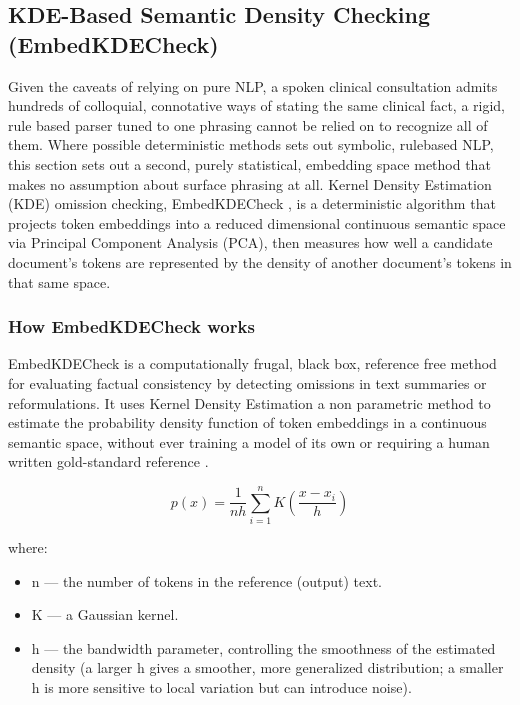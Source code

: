 \documentclass[11pt,a4paper]{article}
\begin{document}
\subsection{KDE-Based Semantic Density Checking (EmbedKDECheck) }
\label{sec:KDE-Based Semantic Density Checking (EmbedKDECheck)}

Given the caveats of relying on pure NLP, a spoken clinical consultation admits hundreds of colloquial, connotative ways of stating the same clinical fact, a rigid, rule based parser tuned to one phrasing cannot be relied on to recognize all of them. Where possible deterministic methods sets out symbolic, rulebased NLP, this section sets out a second, purely statistical, embedding space method that makes no assumption about surface phrasing at all. Kernel Density Estimation (KDE) omission checking, EmbedKDECheck \cite{oUKelmoun2025} , is a deterministic algorithm that projects token embeddings into a reduced dimensional continuous semantic space via Principal Component Analysis (PCA), then measures how well a candidate document's tokens are represented by the density of another document's tokens in that same space.

\subsubsection{ How EmbedKDECheck works}

EmbedKDECheck is a computationally frugal, black box, reference free method for evaluating factual consistency by detecting omissions in text summaries or reformulations. It uses Kernel Density Estimation  a non parametric method to estimate the probability density function of token embeddings in a continuous semantic space, without ever training a model of its own or requiring a human written gold-standard reference \cite{oUKelmoun2025} .

\begin{equation}
    p(x) = \frac{1}{nh} \sum_{i=1}^{n} K\left(\frac{x - x_i}{h}\right)
    \label{eq:kde}
\end{equation}                                                                                                                                                                                                                           

where: 
\begin{itemize}
    \item  n — the number of tokens in the reference (output) text.
    \item  K — a Gaussian kernel. 
    \item h — the bandwidth parameter, controlling the smoothness of the estimated density (a larger h gives a smoother, more generalized distribution; a smaller h is more sensitive to local variation but can introduce noise).

\end{itemize}
\end{document}

